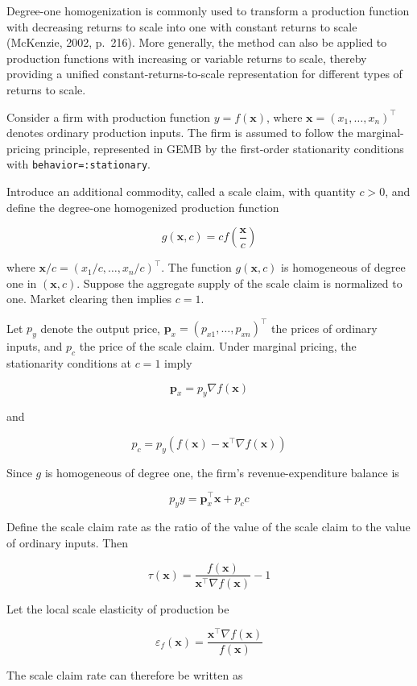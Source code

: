 \documentclass[
  letterpaper,
  DIV=11,
  numbers=noendperiod]{scrreprt}
\begin{document}
Degree-one homogenization is commonly used to transform a production
function with decreasing returns to scale into one with constant returns
to scale (McKenzie, 2002, p.~216). More generally, the method can also
be applied to production functions with increasing or variable returns
to scale, thereby providing a unified constant-returns-to-scale
representation for different types of returns to scale.

Consider a firm with production function \(y=f(\mathbf x)\), where
\(\mathbf x=(x_1,\ldots,x_n)^\top\) denotes ordinary production inputs.
The firm is assumed to follow the marginal-pricing principle,
represented in GEMB by the first-order stationarity conditions with
\texttt{behavior=:stationary}.

Introduce an additional commodity, called a scale claim, with quantity
\(c>0\), and define the degree-one homogenized production function

\[
g(\mathbf x,c)
=
c f\left(\frac{\mathbf x}{c}\right)
\]

where \(\mathbf x/c=(x_1/c,\ldots,x_n/c)^\top\). The function
\(g(\mathbf x,c)\) is homogeneous of degree one in \((\mathbf x,c)\).
Suppose the aggregate supply of the scale claim is normalized to one.
Market clearing then implies \(c=1\).

Let \(p_y\) denote the output price,
\(\mathbf p_x=(p_{x1},\ldots,p_{xn})^\top\) the prices of ordinary
inputs, and \(p_c\) the price of the scale claim. Under marginal
pricing, the stationarity conditions at \(c=1\) imply

\[
\mathbf p_x
=
p_y\nabla f(\mathbf x)
\]

and

\[
p_c
=
p_y
\left(
f(\mathbf x)
-
\mathbf x^\top\nabla f(\mathbf x)
\right)
\]

Since \(g\) is homogeneous of degree one, the firm's revenue-expenditure
balance is

\[
p_yy
=
\mathbf p_x^\top\mathbf x+p_cc
\]

Define the scale claim rate as the ratio of the value of the scale claim
to the value of ordinary inputs. Then

\[
\tau(\mathbf x)
=
\frac{f(\mathbf x)}
{\mathbf x^\top\nabla f(\mathbf x)}
-1
\]

Let the local scale elasticity of production be

\[
\varepsilon_f(\mathbf x)
=
\frac{\mathbf x^\top\nabla f(\mathbf x)}
{f(\mathbf x)}
\]

The scale claim rate can therefore be written as
\end{document}
